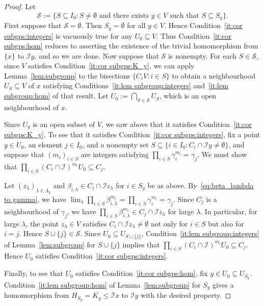 \documentclass[a4paper, 12pt]{amsart}
\theoremstyle{plain}
\theoremstyle{definition}
\theoremstyle{remark}
\newcommand{\Ii}{\mathcal{I}}
\newcommand{\Iicl}{\overline{\mathcal{I}}}
\numberwithin{equation}{section}
\begin{document}
\begin{proof}
Let
\[
    \mathcal{S} := \{S \subseteq I_0 : S \not= \emptyset \text{ and there exists }y \in V \text{ such that } S\subseteq S_y \}.
\]
First suppose that $\mathcal{S} = \emptyset$. Then $S_y=\emptyset$ for all
$y\in V$. Hence Condition~\ref{it:cor subgps:integers} is vacuously true for
any $U_0\subseteq V$. Thus Condition~\ref{it:cor subgps:hom} reduces to
asserting the existence of the trivial homomorphism from $\{x\}$ to $\Ii y$,
and so we are done. Now suppose that $\mathcal{S}$ is nonempty. For each $S
\in \mathcal{S}$, since $V$ satisfies Condition~\ref{it:cor subgps:K_y}, we
can apply Lemma~\ref{lem:subgroup} to the bisections $\{C_i V : i \in S\}$ to
obtain a neighbourhood $U_S \subseteq V$ of $x$ satisfying
Conditions~\ref{it:lem subgroup:integers} and~\ref{it:lem subgroup:hom} of
that result. Let $U_0 := \bigcap_{S \in \mathcal{S}} U_S$, which is an open
neighbourhood of $x$.

Since $U_0$ is an open subset of $V$, we saw above that it satisfies
Condition~\ref{it:cor subgps:K_y}. To see that it satisfies
Condition~\ref{it:cor subgps:integers}, fix a point $y\in U_0$, an element $j
\in I_0$, and a nonempty set $S\subseteq \{i\in I_0 : C_i \cap \Ii y \not=
\emptyset\}$, and suppose that $(m_i)_{i \in S}$ are integers satisfying
$\prod_{i \in S} \gamma_i^{m_i} = \gamma_j$. We must show that $\prod_{i \in
S} (C_i \cap \Ii)^{m_i} U_0 \subseteq C_j$.

Let $(z_\lambda)_{\lambda \in \Lambda_y}$ and $\beta_{i,\lambda}\in C_i \cap
\Ii z_\lambda$ for $i\in S_y$ be as above. By~\eqref{eq:beta_lambda to
gamma}, we have $\lim_\lambda \prod_{i \in S} \beta_{i,\lambda}^{m_i} =
\prod_{i \in S} \gamma_i^{m_i} = \gamma_j$. Since $C_j$ is a neighbourhood of
$\gamma_j$, we have $\prod_{i \in S} \beta_{i,\lambda}^{m_i} \in C_j \cap \Ii
z_\lambda$ for large $\lambda$. In particular, for large $\lambda$, the point
$z_{\lambda} \in V$ satisfies $C_i \cap \Ii z_{\lambda} \not= \emptyset$ not
only for $i\in S$ but also for $i=j$. Hence $S \cup \{j\} \in \mathcal{S}$.
Since $U_0 \subseteq U_{S \cup \{j\}}$, Condition~\ref{it:lem
subgroup:integers} of Lemma~\ref{lem:subgroup} for $S \cup \{j\}$ implies
that $\prod_{i \in S} (C_i \cap \Ii)^{m_i} U_0 \subseteq C_j$. Hence $U_0$
satisfies Condition~\ref{it:cor subgps:integers}.

Finally, to see that $U_0$ satisfies Condition~\ref{it:cor subgps:hom}, fix
$y \in U_0 \subseteq U_{S_{y}}$. Condition~\ref{it:lem subgroup:hom} of
Lemma~\ref{lem:subgroup} for $S_{y}$ gives a homomorphism from $H_{S_{y}} =
K_y \le \Iicl x$ to $\Ii y$ with the desired property.
\end{proof}
\end{document}
